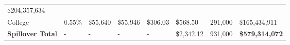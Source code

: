 \documentclass[11pt]{article}
\begin{document}
\begin{longtable}[]{@{}llllllll@{}}
\begin{minipage}[t]{0.08\columnwidth}
\$204,357,634\strut
\end{minipage}\tabularnewline
\begin{minipage}[t]{0.13\columnwidth}\raggedright
College\strut
\end{minipage} & \begin{minipage}[t]{0.14\columnwidth}\raggedright
0.55\%\strut
\end{minipage} & \begin{minipage}[t]{0.09\columnwidth}\raggedright
\$55,640\strut
\end{minipage} & \begin{minipage}[t]{0.09\columnwidth}\raggedright
\$55,946\strut
\end{minipage} & \begin{minipage}[t]{0.08\columnwidth}\raggedright
\$306.03\strut
\end{minipage} & \begin{minipage}[t]{0.08\columnwidth}\raggedright
\$568.50\strut
\end{minipage} & \begin{minipage}[t]{0.08\columnwidth}\raggedright
291,000\strut
\end{minipage} & \begin{minipage}[t]{0.08\columnwidth}\raggedright
\$165,434,911\strut
\end{minipage}\tabularnewline
\begin{minipage}[t]{0.13\columnwidth}\raggedright
\textbf{Spillover Total}\strut
\end{minipage} & \begin{minipage}[t]{0.14\columnwidth}\raggedright
-\strut
\end{minipage} & \begin{minipage}[t]{0.09\columnwidth}\raggedright
-\strut
\end{minipage} & \begin{minipage}[t]{0.09\columnwidth}\raggedright
-\strut
\end{minipage} & \begin{minipage}[t]{0.08\columnwidth}\raggedright
-\strut
\end{minipage} & \begin{minipage}[t]{0.08\columnwidth}\raggedright
\$2,342.12\strut
\end{minipage} & \begin{minipage}[t]{0.08\columnwidth}\raggedright
931,000\strut
\end{minipage} & \begin{minipage}[t]{0.08\columnwidth}\raggedright
\textbf{\$579,314,072}\strut
\end{minipage}\tabularnewline
\bottomrule
\end{longtable}
\end{document}
